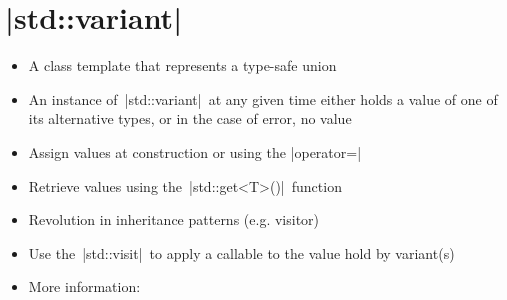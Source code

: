 \section{\CPP|std::variant|}
\begin{frame}[fragile]{\insertsectionhead}
    \vspace{-3mm}
    \begin{itemize}
        \item A class template that represents a type-safe union
        \item An instance of \,\CPP|std::variant|\, at any given time either holds a value of one of its alternative types, or in the case of error, no value 
        \item Assign values at construction or using the \CPP|operator=|
        \item Retrieve values using the \,\CPP|std::get<T>()|\, function
        \item \alert{Revolution in inheritance patterns (e.g. visitor)}
        \item Use the  \,\CPP|std::visit|\, to apply a callable to the value hold by variant(s)
        \item More information: 
    \end{itemize}
\end{frame}
